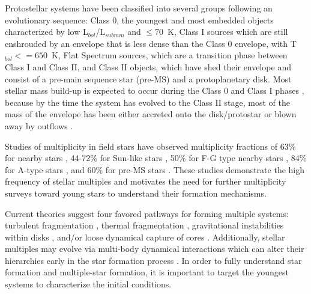 \documentclass[twocolumn, 12pt, trackchanges]{aastex63}
\begin{document}
Protostellar systems have been classified into several groups following an evolutionary sequence: Class 0, the youngest and most embedded objects characterized by low L$_{bol}$/L$_{submm}$ \citep[$<5\times10^{-3}$][]{1993ApJ...406..122A} and \tbol\space$\le$70~K, Class I sources which are still enshrouded by an envelope that is less dense than the Class 0 envelope, with T$_{bol}<=650$~K, Flat Spectrum sources, which are a  transition phase between Class I and Class II, and Class II objects, which have shed their envelope and consist of a pre-main sequence star (pre-MS) and a protoplanetary disk. Most stellar mass build-up is expected to occur during the Class 0 and Class I phases \citep[$<5\times10^{5}$~yr; e.g.][]{2018arXiv180711262K,1987IAUS..115....1L}, because by the time the system has evolved to the Class II stage, most of the mass of the envelope has been either accreted onto the disk/protostar or blown away by outflows \citep[][]{2006ApJ...646.1070A, 2014ApJ...784...61O}.

Studies of multiplicity in field stars have observed multiplicity fractions of 63\% for nearby stars \citep[][]{1962AJ.....67R.590W}, 44-72\% for Sun-like stars \citep[][]{1983ARAA..21..343A, 2010ApJS..190....1R}, 50\% for F-G type nearby stars \citep[][]{1991AA...248..485D}, 84\% for A-type stars \citep[][]{2017ApJS..230...15M}, and 60\% for pre-MS stars \citep[][]{1994ARAA..32..465M}. These studies demonstrate the high frequency of stellar multiples and motivates the need for further multiplicity surveys toward young stars to understand their formation mechanisms.

Current theories suggest four favored pathways for forming multiple systems: turbulent fragmentation \citep[on scales \ab1000s of au; e.g.][]{2004ApJ...617..559P, 2004ApJ...600..769F}, thermal fragmentation \citep[on scales \ab1000s of au; e.g.][]{2010ApJ...725.1485O, 2013ApJ...764..136B}, gravitational instabilities within disks \citep[on scales \ab100s of au; e.g.][]{1989ApJ...347..959A, 2009MNRAS.392..413S, 2010ApJ...708.1585K}, and/or loose dynamical capture of cores \citep[$^{4-5}$~au scales][]{2002MNRAS.336..705B, 2019ApJ...887..232L}. Additionally, stellar multiples may evolve via multi-body dynamical interactions which can alter their hierarchies early in the star formation process \citep{2002MNRAS.336..705B, 2010MNRAS.404..721M, 2012Natur.492..221R}. In order to fully understand star formation and multiple-star formation, it is important to target the youngest systems to characterize the initial conditions.
\end{document}
